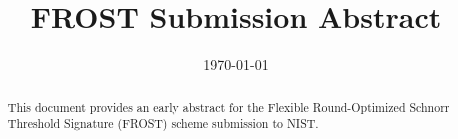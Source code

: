 \documentclass{llncs}
\title{FROST Submission Abstract}
\date{\today}
\author{}
\institute{}
\begin{document}
\let\oldaddcontentsline\addcontentsline
\def\addcontentsline#1#2#3{}

	\maketitle


	\begin{abstract}
    This document provides an early abstract for the Flexible Round-Optimized
    Schnorr Threshold Signature (FROST) scheme submission to NIST.
  \end{abstract}


	
	

	\printbibliography


\end{document}
